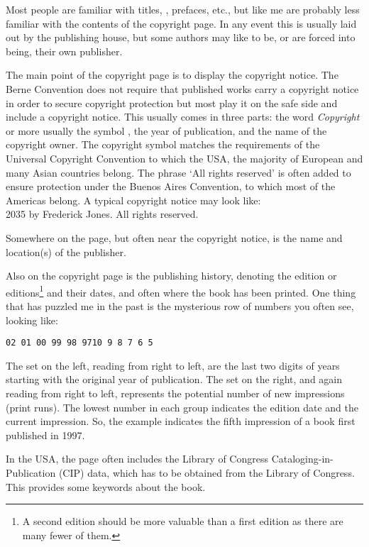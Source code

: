 \documentclass[10pt,letterpaper,extrafontsizes]{memoir}
\begin{document}
    Most people are familiar with titles, \toc, prefaces, etc., but like
me are probably
less familiar with the contents of the copyright page. 
In any event this is
usually laid out by the publishing house, but some authors may like to be,
or are forced into being, their own publisher.

    The main point of the copyright page is to display the 
copyright notice.
The Berne Convention does not require that published works carry a copyright
notice in order to secure copyright protection but most play it on the safe
side and include a copyright notice.
This usually comes in three parts: the word \textit{Copyright} or more usually
the symbol \textcopyright, 
the year of publication, 
and the name of the copyright owner.
The copyright symbol matches the requirements of the Universal Copyright
Convention to which the USA, the majority of European and many Asian
countries belong.
The phrase `All rights reserved' is often added to ensure protection under the
Buenos Aires Convention, to which most of the Americas belong. A typical
copyright notice may look like: \\
{\footnotesize \textcopyright{} 2035 by Frederick Jones. All rights reserved.}

    Somewhere on the page, but often near the copyright notice, is the name 
and location(s) of the publisher.

    Also on the copyright page is the publishing history, denoting the edition
or editions\footnote{A second edition should be more valuable than a first
edition as there are many fewer of them.} and their dates, 
and often where the book has been printed. One thing that has puzzled me in
the past is the mysterious row of numbers you often see, looking like: \\
\centerline{\footnotesize\texttt{02 01 00 99 98 97\hspace{2em}10 9 8 7 6 5}}
The set on the left, reading from right to left, are the last two digits
of years starting with the original year of publication.
The set on the right, and again reading from right to left, represents the
potential number of new impressions (print runs). The lowest number in each 
group indicates the edition date and the current impression. So, the example
indicates the fifth impression of a book first published in 1997.

    In the USA, the page often includes the Library of Congress 
Cataloging-in-Publication (CIP) data, 
which has to be obtained from the
Library of Congress. This provides some keywords about the book.
\end{document}
